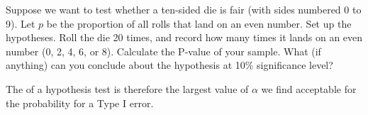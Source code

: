 \ii Suppose we want to test whether a ten-sided die is fair (with sides numbered 0 to 9). Let $p$ be the proportion of all rolls that land on an even number.
\bb
\ii Set up the hypotheses. \vspace{1.5in}
\ii Roll the die 20 times, and record how many times it lands on an even number (0, 2, 4, 6, or 8). \vspace{1in}
\ii Calculate the P-value of your sample. \vfill
\ii What (if anything) can you conclude about the hypothesis at 10\% significance level? \vspace{1.5in}
\ee
\ee

\bbox
The \textbf{} of a hypothesis test is therefore the largest value of $\alpha$ we find acceptable for the probability for a Type I error.
\ebox


